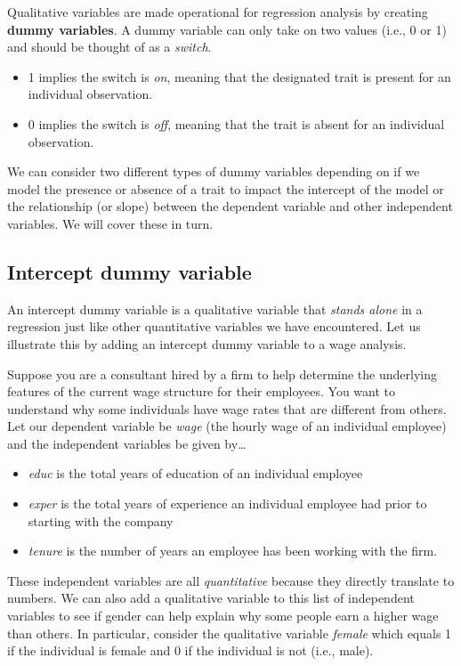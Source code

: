 \documentclass[
]{book}
\begin{document}
Qualitative variables are made operational for regression analysis by creating \textbf{dummy variables}. A dummy variable can only take on two values (i.e., 0 or 1) and should be thought of as a \emph{switch}.

\begin{itemize}
\item
  1 implies the switch is \emph{on}, meaning that the designated trait is present for an individual observation.
\item
  0 implies the switch is \emph{off}, meaning that the trait is absent for an individual observation.
\end{itemize}

We can consider two different types of dummy variables depending on if we model the presence or absence of a trait to impact the intercept of the model or the relationship (or slope) between the dependent variable and other independent variables. We will cover these in turn.

\hypertarget{intercept-dummy-variable}{%
\subsection{Intercept dummy variable}\label{intercept-dummy-variable}}

An intercept dummy variable is a qualitative variable that \emph{stands alone} in a regression just like other quantitative variables we have encountered. Let us illustrate this by adding an intercept dummy variable to a wage analysis.

Suppose you are a consultant hired by a firm to help determine the underlying features of the current wage structure for their employees. You want to understand why some individuals have wage rates that are different from others. Let our dependent variable be \emph{wage} (the hourly wage of an individual employee) and the independent variables be given by\ldots{}

\begin{itemize}
\item
  \emph{educ} is the total years of education of an individual employee
\item
  \emph{exper} is the total years of experience an individual employee had prior to starting with the company
\item
  \emph{tenure} is the number of years an employee has been working with the firm.
\end{itemize}

These independent variables are all \emph{quantitative} because they directly translate to numbers. We can also add a qualitative variable to this list of independent variables to see if gender can help explain why some people earn a higher wage than others. In particular, consider the qualitative variable \emph{female} which equals 1 if the individual is female and 0 if the individual is not (i.e., male).
\end{document}
